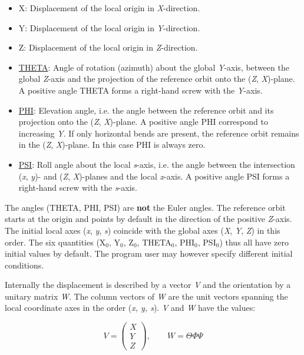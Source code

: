 \begin{itemize}
	\item X: Displacement of the local origin in \textit{X}-direction. 
	\item Y: Displacement of the local origin in \textit{Y}-direction. 
	\item Z: Displacement of the local origin in \textit{Z}-direction. 
	\item \href{theta}{THETA}: Angle of rotation (azimuth) about the global \textit{Y}-axis, between the global \textit{Z}-axis and the projection of the reference orbit onto the (\textit{Z}, \textit{X})-plane. A positive angle THETA forms a right-hand screw with the \textit{Y}-axis. 
	\item \href{phi}{PHI}: Elevation angle, i.e. the angle between the reference orbit and its projection onto the (\textit{Z}, \textit{X})-plane. A positive angle PHI correspond to increasing \textit{Y}. If only horizontal bends are present, the reference orbit remains in the (\textit{Z}, \textit{X})-plane. In this case PHI is always zero. 
	\item \href{psi}{PSI}: Roll angle about the local \textit{s}-axis, i.e. the angle between the intersection (\textit{x}, \textit{y})- and (\textit{Z}, \textit{X})-planes and the local \textit{x}-axis. A positive angle PSI forms a right-hand screw with the \textit{s}-axis. 
\end{itemize} The angles (THETA, PHI, PSI) are \textbf{not} the Euler angles. The reference orbit starts at the origin and points by default in the direction of the positive \textit{Z}-axis. The initial local axes (\textit{x}, \textit{y}, \textit{s})  coincide with the global axes (\textit{X}, \textit{Y}, \textit{Z}) in this order. The six quantities (X$_0$, Y$_0$, Z$_0$, THETA$_0$, PHI$_0$, PSI$_0$) thus all have zero initial values by default. The program user may however specify different initial conditions. 

 Internally the displacement is described by a vector \textit{V} and the orientation by a unitary matrix \textit{W}. The column vectors of \textit{W} are the unit vectors spanning  the local coordinate axes in the order (\textit{x, y, s}). \textit{V} and \textit{W} have the values: 


\[
V =
 \begin{pmatrix}
  X \\
  Y \\
  Z
 \end{pmatrix}
, \quad\quad
W=\Theta\Phi\Psi
\]

